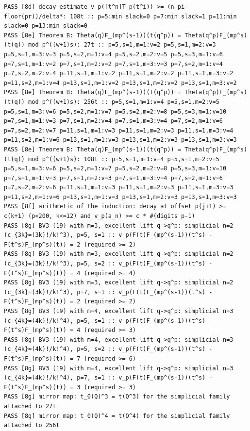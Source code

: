 \documentclass[11pt,a4paper]{article}
\theoremstyle{definition}\newtheorem{definition}[theorem]{Definition}
\theoremstyle{remark}\newtheorem{remark}[theorem]{Remark}
\numberwithin{equation}{section}
\begin{document}
\begin{lstlisting}
PASS [8d] decay estimate v_p([t^n]T_p(t^i)) >= (n-pi-floor(pr))/delta*: 108t :: p=5:min slack=0 p=7:min slack=1 p=11:min slack=0 p=13:min slack=0
PASS [8e] Theorem B: Theta(q)F_(mp^(s-1))(t(q^p)) = Theta(q^p)F_(mp^s)(t(q)) mod p^((w+1)s): 27t :: p=5,s=1,m=1:v=2 p=5,s=1,m=2:v=3 p=5,s=1,m=3:v=3 p=5,s=2,m=1:v=4 p=5,s=2,m=2:v=5 p=5,s=3,m=1:v=6 p=7,s=1,m=1:v=2 p=7,s=1,m=2:v=2 p=7,s=1,m=3:v=3 p=7,s=2,m=1:v=4 p=7,s=2,m=2:v=4 p=11,s=1,m=1:v=2 p=11,s=1,m=2:v=2 p=11,s=1,m=3:v=2 p=11,s=2,m=1:v=4 p=13,s=1,m=1:v=2 p=13,s=1,m=2:v=2 p=13,s=1,m=3:v=2
PASS [8e] Theorem B: Theta(q)F_(mp^(s-1))(t(q^p)) = Theta(q^p)F_(mp^s)(t(q)) mod p^((w+1)s): 256t :: p=5,s=1,m=1:v=4 p=5,s=1,m=2:v=5 p=5,s=1,m=3:v=6 p=5,s=2,m=1:v=7 p=5,s=2,m=2:v=8 p=5,s=3,m=1:v=10 p=7,s=1,m=1:v=3 p=7,s=1,m=2:v=4 p=7,s=1,m=3:v=4 p=7,s=2,m=1:v=6 p=7,s=2,m=2:v=7 p=11,s=1,m=1:v=3 p=11,s=1,m=2:v=3 p=11,s=1,m=3:v=4 p=11,s=2,m=1:v=6 p=13,s=1,m=1:v=3 p=13,s=1,m=2:v=3 p=13,s=1,m=3:v=3
PASS [8e] Theorem B: Theta(q)F_(mp^(s-1))(t(q^p)) = Theta(q^p)F_(mp^s)(t(q)) mod p^((w+1)s): 108t :: p=5,s=1,m=1:v=4 p=5,s=1,m=2:v=5 p=5,s=1,m=3:v=6 p=5,s=2,m=1:v=7 p=5,s=2,m=2:v=8 p=5,s=3,m=1:v=10 p=7,s=1,m=1:v=3 p=7,s=1,m=2:v=3 p=7,s=1,m=3:v=4 p=7,s=2,m=1:v=6 p=7,s=2,m=2:v=6 p=11,s=1,m=1:v=3 p=11,s=1,m=2:v=3 p=11,s=1,m=3:v=3 p=11,s=2,m=1:v=6 p=13,s=1,m=1:v=3 p=13,s=1,m=2:v=3 p=13,s=1,m=3:v=3
PASS [8f] arithmetic of the induction: decay at offset p(j+1) >= c(k+1) (p<200, k<=12) and v_p(a_n) >= c * #(digits p-1)
PASS [8g] BV3 (19) with m=3, excellent lift q->q^p: simplicial n=2 (c_{3k}=(3k)!/k!^3), p=5, s=1 :: v_p(F(t)F_(mp^(s-1))(t^s) - F(t^s)F_(mp^s)(t)) = 2 (required >= 2)
PASS [8g] BV3 (19) with m=3, excellent lift q->q^p: simplicial n=2 (c_{3k}=(3k)!/k!^3), p=5, s=2 :: v_p(F(t)F_(mp^(s-1))(t^s) - F(t^s)F_(mp^s)(t)) = 4 (required >= 4)
PASS [8g] BV3 (19) with m=3, excellent lift q->q^p: simplicial n=2 (c_{3k}=(3k)!/k!^3), p=7, s=1 :: v_p(F(t)F_(mp^(s-1))(t^s) - F(t^s)F_(mp^s)(t)) = 2 (required >= 2)
PASS [8g] BV3 (19) with m=4, excellent lift q->q^p: simplicial n=3 (c_{4k}=(4k)!/k!^4), p=5, s=1 :: v_p(F(t)F_(mp^(s-1))(t^s) - F(t^s)F_(mp^s)(t)) = 4 (required >= 3)
PASS [8g] BV3 (19) with m=4, excellent lift q->q^p: simplicial n=3 (c_{4k}=(4k)!/k!^4), p=5, s=2 :: v_p(F(t)F_(mp^(s-1))(t^s) - F(t^s)F_(mp^s)(t)) = 7 (required >= 6)
PASS [8g] BV3 (19) with m=4, excellent lift q->q^p: simplicial n=3 (c_{4k}=(4k)!/k!^4), p=7, s=1 :: v_p(F(t)F_(mp^(s-1))(t^s) - F(t^s)F_(mp^s)(t)) = 3 (required >= 3)
PASS [8g] mirror map: t_0(Q)^3 = t(Q^3) for the simplicial family attached to 27t
PASS [8g] mirror map: t_0(Q)^4 = t(Q^4) for the simplicial family attached to 256t

\end{lstlisting}
\end{document}
